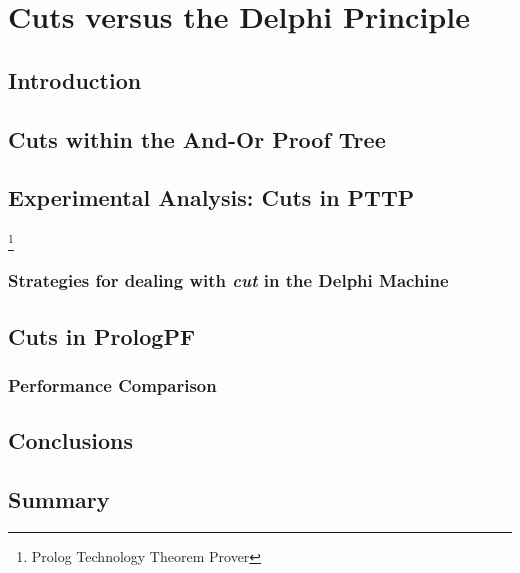 \chapter{Cuts versus the Delphi Principle}
\label{cut}

\section{Introduction}

\section{Cuts within the And-Or Proof Tree}

\section{Experimental Analysis: Cuts in PTTP}
\footnote{Prolog Technology Theorem Prover}

\subsection{Strategies for dealing with \textit{cut} in the Delphi Machine}

\section{Cuts in PrologPF}

\subsection{Performance Comparison}

\section{Conclusions}

\section{Summary}

